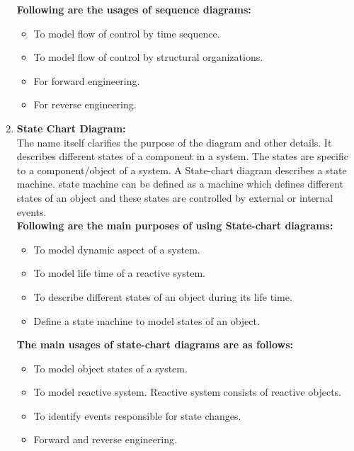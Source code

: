 \documentclass[12pt]{extreport}
\begin{document}
\begin{enumerate}
\textbf{Following are the usages of sequence diagrams:}
\begin{itemize}
	\item To model flow of control by time sequence.
	\item To model flow of control by structural organizations.
	\item For forward engineering.
	\item For reverse engineering.
\end{itemize}

\item \textbf{State Chart Diagram:}\\
The name itself clarifies the purpose of the diagram and other details. It describes different states of a component in a system. The states are specific to a component/object of a system. A State-chart diagram describes a state machine. state machine can be defined as a machine which defines different states of an object and these states are controlled by external or internal events.\\
\newline
\textbf{Following are the main purposes of using State-chart diagrams:}
\begin{itemize}
	\item To model dynamic aspect of a system.
	\item To model life time of a reactive system.
	\item To describe different states of an object during its life time.
	\item Define a state machine to model states of an object.
\end{itemize}

\textbf{The main usages of state-chart diagrams are as follows:}
\begin{itemize}
	\item To model object states of a system.
	\item To model reactive system. Reactive system consists of reactive objects.
    \item To identify events responsible for state changes.
	\item Forward and reverse engineering.
\end{itemize}



\end{enumerate}
\end{document}
